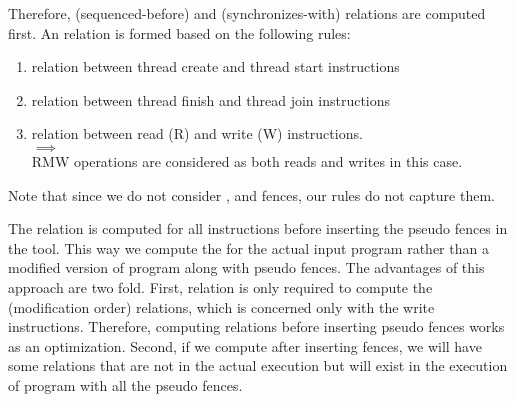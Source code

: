 \par
Therefore, \setSB (sequenced-before) and \setSW (synchronizes-with) 
relations are computed first. 
An \setSW relation is formed based on the following rules:
\begin{enumerate}
\item \setSW relation between thread create and thread start instructions\\

\item \setSW relation between thread finish and thread join instructions\\

\item \setSW relation between read (R) and write (W) instructions.\\
 $\implies$ \\
RMW operations are considered as both reads and writes in this case.
\end{enumerate}
Note that since we do not consider \moacq, \morel and \moar fences, 
our \setSW rules do not capture them.
\par


%	

\par
The \setHB relation is computed for all instructions before inserting the 
pseudo fences in the tool. 
This way we compute the \setHB for the actual input program rather than a 
modified version of program along with pseudo fences. The advantages of this
approach are two fold. First, \setHB relation is only required 
to compute the \setMO (modification order) relations, which is concerned only 
with the write instructions. Therefore, computing \setHB relations before 
inserting pseudo fences works as an optimization. Second, if we compute \setHB
after inserting fences, we will have some \setHB relations that are not in 
the actual execution but will exist in the execution of program with all the 
pseudo fences. 

